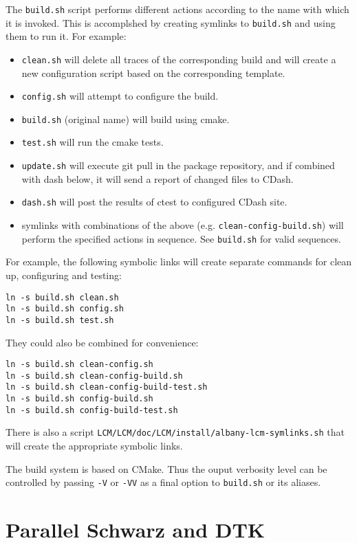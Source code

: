 \documentclass{article}
\begin{document}
The \verb+build.sh+ script performs different actions according to the name with
which it is invoked. This is accomplshed by creating symlinks to \verb+build.sh+
and using them to run it. For example:
\begin{itemize}
\item \verb+clean.sh+ will delete all traces of the corresponding build and will
  create a new configuration script based on the corresponding template.

\item \verb+config.sh+ will attempt to configure the build.

\item \verb+build.sh+ (original name) will build using cmake.

\item \verb+test.sh+ will run the cmake tests.

\item \verb+update.sh+ will execute git pull in the package repository, and if
  combined with dash below, it will send a report of changed files to CDash.

\item \verb+dash.sh+ will post the results of ctest to configured CDash site.

\item symlinks with combinations of the above
  (e.g. \verb+clean-config-build.sh+) will perform the specified actions in
  sequence. See \verb+build.sh+ for valid sequences.
\end{itemize}
For example, the following symbolic links will create separate
commands for clean up, configuring and testing:
\begin{verbatim}
ln -s build.sh clean.sh
ln -s build.sh config.sh
ln -s build.sh test.sh
\end{verbatim}
They could also be combined for convenience:
\begin{verbatim}
ln -s build.sh clean-config.sh
ln -s build.sh clean-config-build.sh
ln -s build.sh clean-config-build-test.sh
ln -s build.sh config-build.sh
ln -s build.sh config-build-test.sh
\end{verbatim}
There is also a script
\verb+LCM/LCM/doc/LCM/install/albany-lcm-symlinks.sh+
that will create the appropriate symbolic links.

The build system is based on CMake. Thus the ouput verbosity level can be
controlled by passing \verb+-V+ or \verb+-VV+ as a final option to
\verb+build.sh+ or its aliases.

\section{Parallel Schwarz and DTK}
\label{sec:dtk}
\end{document}
